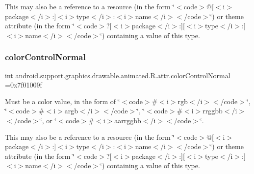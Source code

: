 This may also be a reference to a resource (in the form \char`\"{}$<$code$>$@\mbox{[}$<$i$>$package$<$/i$>$\+:\mbox{]}$<$i$>$type$<$/i$>$\+:$<$i$>$name$<$/i$>$$<$/code$>$\char`\"{}) or theme attribute (in the form \char`\"{}$<$code$>$?\mbox{[}$<$i$>$package$<$/i$>$\+:\mbox{]}\mbox{[}$<$i$>$type$<$/i$>$\+:\mbox{]}$<$i$>$name$<$/i$>$$<$/code$>$\char`\"{}) containing a value of this type. \mbox{\label{classandroid_1_1support_1_1graphics_1_1drawable_1_1animated_1_1R_1_1attr_a7b04f3c1f3b3cda93a8f18ffab082874}} 
\subsubsection{\texorpdfstring{color\+Control\+Normal}{colorControlNormal}}
{\footnotesize\ttfamily int android.\+support.\+graphics.\+drawable.\+animated.\+R.\+attr.\+color\+Control\+Normal =0x7f01009f\hspace{0.3cm}{\ttfamily [static]}}

Must be a color value, in the form of \char`\"{}$<$code$>$\#$<$i$>$rgb$<$/i$>$$<$/code$>$\char`\"{}, \char`\"{}$<$code$>$\#$<$i$>$argb$<$/i$>$$<$/code$>$\char`\"{}, \char`\"{}$<$code$>$\#$<$i$>$rrggbb$<$/i$>$$<$/code$>$\char`\"{}, or \char`\"{}$<$code$>$\#$<$i$>$aarrggbb$<$/i$>$$<$/code$>$\char`\"{}. 

This may also be a reference to a resource (in the form \char`\"{}$<$code$>$@\mbox{[}$<$i$>$package$<$/i$>$\+:\mbox{]}$<$i$>$type$<$/i$>$\+:$<$i$>$name$<$/i$>$$<$/code$>$\char`\"{}) or theme attribute (in the form \char`\"{}$<$code$>$?\mbox{[}$<$i$>$package$<$/i$>$\+:\mbox{]}\mbox{[}$<$i$>$type$<$/i$>$\+:\mbox{]}$<$i$>$name$<$/i$>$$<$/code$>$\char`\"{}) containing a value of this type. \mbox{\label{classandroid_1_1support_1_1graphics_1_1drawable_1_1animated_1_1R_1_1attr_adf97b41b3855381d9f0976f7aa60b62d}} 
